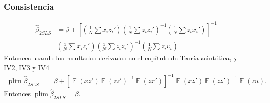 \documentclass[t, compress, spanish, aspectratio=169]{beamer}
\DeclareMathOperator{\plim}{plim}
\DeclareMathOperator{\E}{\mathbb{E}}
\begin{document}

\begin{frame}
    \frametitle{Consistencia}
        \begin{align*}
            \hat \beta_{2SLS} &=\beta+\left[\left(\frac{1}{N}\sum x_i z_i'\right)\left(\frac{1}{N}\sum z_i z_i'\right)^{-1}\left(\frac{1}{N}\sum z_i x_i'\right) \right]^{-1}\\
                        &
                        \left(\frac{1}{N}\sum x_i z_i'\right)\left(\frac{1}{N}\sum z_i z_i'\right)^{-1}\left(\frac{1}{N}\sum z_i u_i\right)
        \end{align*}
        Entonces usando los resultados derivados en el cap\'itulo de Teor\'ia asint\'otica, y IV2, IV3 y IV4
        \begin{align*}
            \plim\hat \beta_{2SLS} &=\beta+[\E(xz')\E(zz')^{-1}\E(zx')]^{-1}\E(xz')\E(zz')^{-1}\E(zu).
        \end{align*}
        Entonces $\plim \hat \beta_{2SLS}=\beta$.
\end{frame}
%
%
\end{document}
